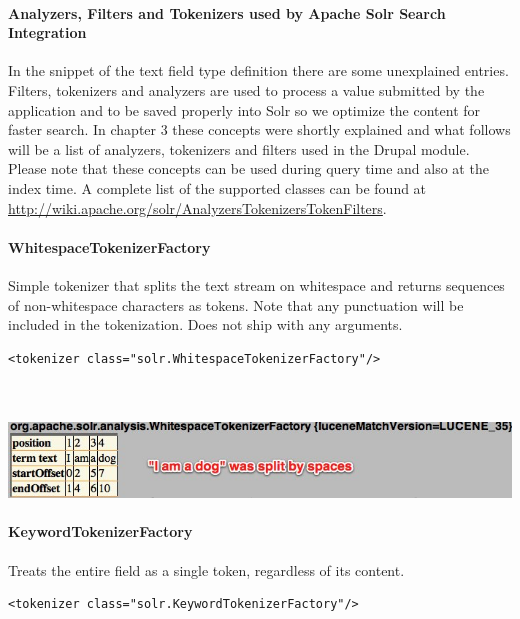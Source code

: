 \paragraph{Analyzers, Filters and Tokenizers used by Apache Solr Search Integration}
In the snippet of the text field type definition there are some unexplained entries. Filters, tokenizers and analyzers are used to process a value submitted by the application and to be saved properly into Solr so we optimize the content for faster search. In chapter 3 these concepts were shortly explained and what follows will be a list of analyzers, tokenizers and filters used in the Drupal module. Please note that these concepts can be used during query time and also at the index time.
A complete list of the supported classes can be found at \url{http://wiki.apache.org/solr/AnalyzersTokenizersTokenFilters}.

\paragraph{}

\paragraph{WhitespaceTokenizerFactory} Simple tokenizer that splits the text stream on whitespace and returns sequences of non-whitespace characters as tokens. Note that any punctuation will be included in the tokenization. Does not ship with any arguments.
\begin{verbatim}
<tokenizer class="solr.WhitespaceTokenizerFactory"/>
\end{verbatim}
\mbox{} \\
\mbox{} \\
\includegraphics[width=\textwidth]{images/whitespacetokenizerfactory.jpg}

\paragraph{KeywordTokenizerFactory} Treats the entire field as a single token, regardless of its content.
\begin{verbatim}
<tokenizer class="solr.KeywordTokenizerFactory"/>
\end{verbatim}


